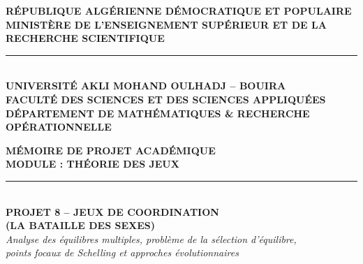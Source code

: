 \documentclass[11pt,a4paper]{article}
\begin{document}
\hypersetup{pageanchor=false}

\begin{titlepage}
\begin{center}
    {\large \textbf{RÉPUBLIQUE ALGÉRIENNE DÉMOCRATIQUE ET POPULAIRE}}\\[1.5mm]
    {\large \textbf{MINISTÈRE DE L'ENSEIGNEMENT SUPÉRIEUR ET DE LA RECHERCHE SCIENTIFIQUE}}\\[3mm]
    \rule{\linewidth}{0.6pt}\\[3mm]
    {\Large \textbf{UNIVERSITÉ AKLI MOHAND OULHADJ -- BOUIRA}}\\[2mm]
    {\large \textbf{FACULTÉ DES SCIENCES ET DES SCIENCES APPLIQUÉES}}\\[1.5mm]
    {\large \textbf{DÉPARTEMENT DE MATHÉMATIQUES \& RECHERCHE OPÉRATIONNELLE}}\\[6mm]
    
    \vfill
    
    \begin{tcolorbox}[colback=blue!6!white,colframe=blue!80!black,arc=4mm,boxrule=1.2pt,center,width=0.96\linewidth]
    \begin{center}
        \vspace{2mm}
        {\huge \textbf{MÉMOIRE DE PROJET ACADÉMIQUE}}\\[3mm]
        {\Large \textbf{MODULE : THÉORIE DES JEUX}}\\[4mm]
        \rule{0.8\linewidth}{0.8pt}\\[4mm]
        {\LARGE \textbf{PROJET 8 -- JEUX DE COORDINATION}}\\[2mm]
        {\LARGE \textbf{(LA BATAILLE DES SEXES)}}\\[3mm]
        {\large \textit{Analyse des équilibres multiples, problème de la sélection d'équilibre,}}\\[1.5mm]
        {\large \textit{points focaux de Schelling et approches évolutionnaires}}
        \vspace{2mm}
    \end{center}
    \end{tcolorbox}

    \vfill


\end{center}
\end{titlepage}
\end{document}
